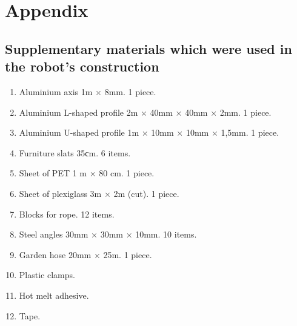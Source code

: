 \section{Appendix}

\subsection{Supplementary materials which were used in the robot's construction}

\begin{enumerate}
	\item Aluminium axis 1m $\times$ 8mm. 1 piece.
	\item Aluminium L-shaped profile 2m $\times$ 40mm $\times$ 40mm $\times$ 2mm. 1 piece.
	\item Aluminium U-shaped profile 1m $\times$ 10mm $\times$ 10mm $\times$ 1,5mm. 1 piece.
	\item Furniture slats 35сm. 6 items.
	\item Sheet of PET 1 m $\times$ 80 cm. 1 piece.
	\item Sheet of plexiglass 3m $\times$ 2m (cut). 1 piece.
	\item Blocks for rope. 12 items.
	\item Steel angles 30mm $\times$ 30mm $\times$ 10mm. 10 items.
	\item Garden hose 20mm $\times$ 25m. 1 piece.
	
	\item Plastic clamps.
	\item Hot melt adhesive.
	\item Tape.
\end{enumerate}

\fillpage



